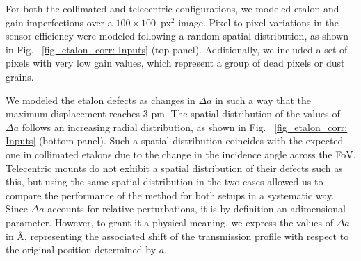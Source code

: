 For both the collimated and telecentric configurations, we modeled etalon and gain imperfections over a $100\times100$~px$^2$ image. Pixel-to-pixel variations in the sensor efficiency were modeled following a random spatial distribution, as shown in Fig.~ \ref{fig_etalon_corr: Inputs} (top panel). Additionally, we included a set of pixels with very low gain values, which represent a group of dead pixels or dust grains.

We modeled the etalon defects as changes in $\Delta a$ in such a way that the maximum displacement reaches $3$ pm. The spatial distribution of the values of  $\Delta a $ follows an increasing radial distribution, as shown in Fig.~ \ref{fig_etalon_corr: Inputs} (bottom panel). Such a spatial distribution coincides with the expected one in collimated etalons due to the change in the incidence angle across the FoV. Telecentric mounts do not exhibit a spatial distribution of their defects such as this, but using the same spatial distribution in the two cases allowed us to compare the performance of the method for both setups in a systematic way. Since $\Delta a$ accounts for relative perturbations, it is by definition an adimensional parameter. However, to grant it a physical meaning, we express the values of $\Delta a$ in \r{A}, representing the associated shift of the transmission profile with respect to the original position determined by $a$.

